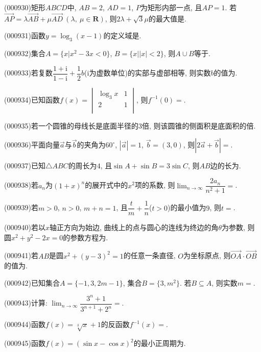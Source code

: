\item (000930)矩形$ABCD$中, $AB=2$, $AD=1$, $P$为矩形内部一点, 且$AP=1$. 若$\overrightarrow{AP}=\lambda \overrightarrow{AB}+\mu \overrightarrow{AD} \ (\lambda,\ \mu \in \mathbf{R})$, 则$2 \lambda +\sqrt3\mu$的最大值是.
\item (000931)函数$y=\log_3 (x-1)$的定义域是.
\item (000932)集合$A=\{x|x^2-3x<0\}$, $B=\{x||x|<2\}$, 则$A\cup B$等于.
\item (000933)若复数$\dfrac{1+\mathrm{i}}{1-\mathrm{i}}+\dfrac12b$($\mathrm{i}$为虚数单位)的实部与虚部相等, 则实数$b$的值为.
\item (000934)已知函数$f(x)=\begin{vmatrix}   {\log _3}x & 1  \\   2 & 1  \\\end{vmatrix}$, 则$f^{-1}(0)=$.
\item (000935)若一个圆锥的母线长是底面半径的$3$倍, 则该圆锥的侧面积是底面积的倍.
\item (000936)平面向量$\overrightarrow a$与$\overrightarrow b$的夹角为$60^\circ$, $|\overrightarrow a|=1$, $\overrightarrow b=(3,0)$, 则$|2 \overrightarrow a+\overrightarrow b|=$.
\item (000937)已知$\triangle ABC$的周长为$4$, 且$\sin A+\sin B=3 \sin C$, 则$AB$边的长为.
\item (000938)若$a_n$为$(1+x)^n$的展开式中的$x^2$项的系数, 则$\displaystyle\lim_{n\to\infty}\dfrac{2a_n}{n^2+1}=$.
\item (000939)若$m>0$, $n>0$, $m+n=1$, 且$\dfrac t m+\dfrac 1 n$($t>0$)的最小值为$9$, 则$t=$.
\item (000940)若以$x$轴正方向为始边, 曲线上的点与圆心的连线为终边的角$\theta$为参数, 则圆$x^2+y^2-2x=0$的参数方程为.
\item (000941)若$AB$是圆$x^2+(y-3)^2=1$的任意一条直径, $O$为坐标原点, 则$\overrightarrow{OA}\cdot \overrightarrow{OB}$的值为.
\item (000942)已知集合$A=\{-1,3,2m-1\}$, 集合$B=\{3,m^2\}$. 若$B\subseteq A$, 则实数$m=$.
\item (000943)计算: $\displaystyle\lim_{n\to\infty}\dfrac{3^n+1}{3^{n+1}+2^n}=$.
\item (000944)函数$f(x)=\sqrt[3]x+1$的反函数$f^{-1}(x)=$.
\item (000945)函数$f(x)=(\sin x-\cos x)^2$的最小正周期为.
